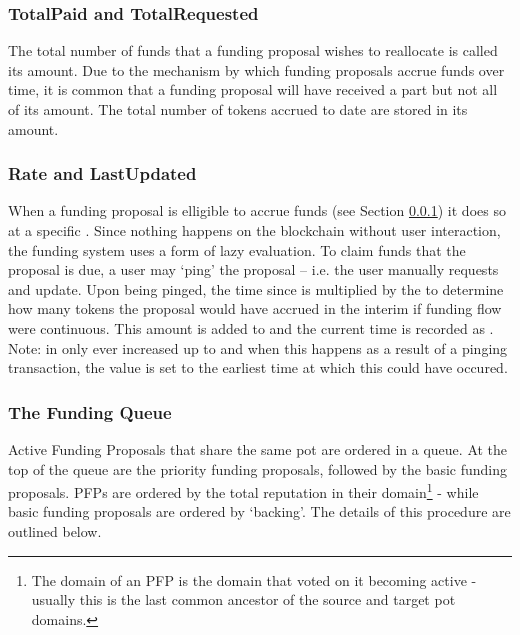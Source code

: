 \subsubsection*{TotalPaid and TotalRequested}
The total number of funds that a funding proposal wishes to reallocate is called its  amount. Due to the mechanism by which funding proposals accrue funds over time, it is common that a funding proposal will have received a part but not all of its  amount. The total number of tokens accrued to date are stored in its  amount. 

\subsubsection*{Rate and LastUpdated}
When a funding proposal is elligible to accrue funds (see Section \ref{subsec:funding-queue}) it does so at a specific . Since nothing happens on the blockchain without user interaction, the funding system uses a form of lazy evaluation. To claim funds that the proposal is due, a user may `ping' the proposal -- i.e. the user manually requests and update. Upon being pinged, the time since  is multiplied by the  to determine how many tokens the proposal would have accrued in the interim if funding flow were continuous. This amount is added to  and the current time is recorded as .\\
Note:  in only ever increased up to  and when this happens as a result of a pinging transaction, the  value is set to the earliest time at which this could have occured.

\subsubsection{The Funding Queue}\label{subsec:funding-queue}
Active Funding Proposals that share the same  pot are ordered in a queue. At the top of the queue are the priority funding proposals, followed by the basic funding proposals. PFPs are ordered by the total reputation in their domain\footnote{The domain of an PFP is the domain that voted on it becoming active - usually this is the last common ancestor of the source and target pot domains.} - while basic funding proposals are ordered by `backing'.  The details of this procedure are outlined below.\\



